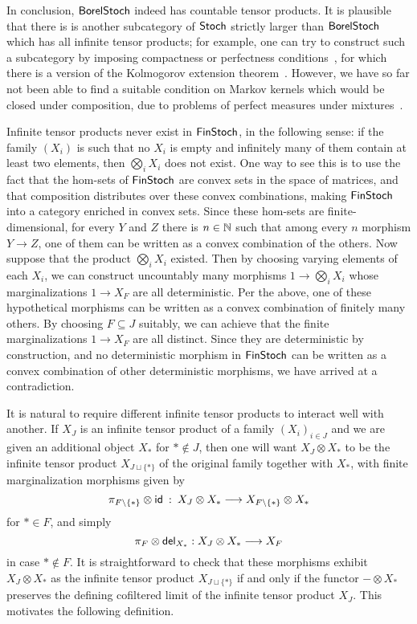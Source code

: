 \documentclass[11pt]{article}
\begin{document}
\begin{example}
	In conclusion, $\operatorname{\mathsf{BorelStoch}}$ indeed has countable tensor products. It is plausible that there is is another subcategory of $\operatorname{\mathsf{Stoch}}$ strictly larger than $\operatorname{\mathsf{BorelStoch}}$ which has all infinite tensor products; for example, one can try to construct such a subcategory by imposing compactness or perfectness conditions~\cite[\S{451}]{fremlin4}, for which there is a version of the Kolmogorov extension theorem~\cite[Corollary~454G]{fremlin4}. However, we have so far not been able to find a suitable condition on Markov kernels which would be closed under composition, due to problems of perfect measures under mixtures~\cite{ramachandran}.
\end{example}

\begin{example}
	\label{infprods_finstoch}
	Infinite tensor products never exist in $\operatorname{\mathsf{FinStoch}}$, in the following sense: if the family $(X_i)$ is such that no $X_i$ is empty and infinitely many of them contain at least two elements, then $\bigotimes_i X_i$ does not exist. One way to see this is to use the fact that the hom-sets of $\operatorname{\mathsf{FinStoch}}$ are convex sets in the space of matrices, and that composition distributes over these convex combinations, making $\operatorname{\mathsf{FinStoch}}$ into a category enriched in convex sets. Since these hom-sets are finite-dimensional, for every $Y$ and $Z$ there is $n \in \mathbb{N}$ such that among every $n$ morphism $Y \to Z$, one of them can be written as a convex combination of the others. Now suppose that the product $\bigotimes_i X_i$ existed. Then by choosing varying elements of each $X_i$, we can construct uncountably many morphisms $1 \to \bigotimes_i X_i$ whose marginalizations $1 \to X_F$ are all deterministic. Per the above, one of these hypothetical morphisms can be written as a convex combination of finitely many others. By choosing $F \subseteq J$ suitably, we can achieve that the finite marginalizations $1 \to X_F$ are all distinct. Since they are deterministic by construction, and no deterministic morphism in $\operatorname{\mathsf{FinStoch}}$ can be written as a convex combination of other deterministic morphisms, we have arrived at a contradiction.
\end{example}

It is natural to require different infinite tensor products to interact well with another. If $X_J$ is an infinite tensor product of a family $(X_i)_{i \in J}$ and we are given an additional object $X_\ast$ for $\ast \not \in J$, then one will want $X_J \otimes X_\ast$ to be the infinite tensor product $X_{J \sqcup \{\ast\}}$ of the original family together with $X_\ast$, with finite marginalization morphisms given by
\[
		\pi_{F \setminus \{\ast\}} \otimes \mathsf{id} \: : \: X_J \otimes X_\ast \longrightarrow X_{F \setminus \{\ast\}} \otimes X_\ast
\]
for $\ast \in F$, and simply
\[
		\pi_F \otimes \mathsf{del}_{X_\ast} : X_J \otimes X_\ast \longrightarrow X_F 
\]
in case $\ast \not \in F$. It is straightforward to check that these morphisms exhibit $X_J \otimes X_\ast$ as the infinite tensor product $X_{J \sqcup \{\ast\}}$ if and only if the functor $- \otimes X_\ast$ preserves the defining cofiltered limit of the infinite tensor product $X_J$. This motivates the following definition.
\end{document}

